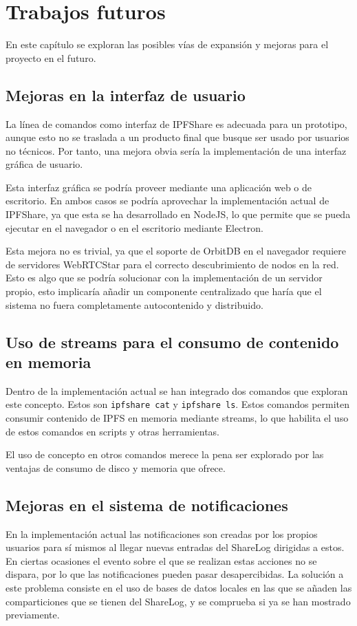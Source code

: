 \chapter{Trabajos futuros}\label{chap:7trabajosfuturos}

En este capítulo se exploran las posibles vías de expansión y mejoras para el proyecto en el futuro.

\section{Mejoras en la interfaz de usuario}
La línea de comandos como interfaz de IPFShare es adecuada para un prototipo, aunque esto no se traslada a un
producto final que busque ser usado por usuarios no técnicos. Por tanto, una mejora obvia sería la implementación de una interfaz gráfica de usuario.

Esta interfaz gráfica se podría proveer mediante una aplicación web o de escritorio. En ambos casos se podría aprovechar la implementación actual de IPFShare, ya que
esta se ha desarrollado en NodeJS, lo que permite que se pueda ejecutar en el navegador o en el escritorio mediante Electron\cite{BuildCrossplatformDesktop}.

Esta mejora no es trivial, ya que el soporte de OrbitDB en el navegador requiere de servidores WebRTCStar \cite{OrbitDBrtc2023} para el correcto descubrimiento de nodos en la red. Esto es algo que se podría solucionar con la implementación de un servidor propio, esto implicaría añadir un componente centralizado que
haría que el sistema no fuera completamente autocontenido y distribuido.

\section{Uso de streams para el consumo de contenido en memoria}
Dentro de la implementación actual se han integrado dos comandos que exploran este concepto. Estos son \texttt{ipfshare cat} y \texttt{ipfshare ls}.
Estos comandos permiten consumir contenido de IPFS en memoria mediante streams, lo que habilita el uso de estos comandos en scripts y otras herramientas.

El uso de concepto en otros comandos merece la pena ser explorado por las ventajas de consumo de disco y memoria que ofrece.

\section{Mejoras en el sistema de notificaciones}
En la implementación actual las notificaciones son creadas por los propios usuarios para sí mismos al llegar nuevas entradas
del ShareLog dirigidas a estos. En ciertas ocasiones el evento sobre el que se realizan estas acciones no se dispara, por lo que
las notificaciones pueden pasar desapercibidas. La solución a este problema consiste en el uso de bases de datos locales
en las que se añaden las comparticiones que se tienen del ShareLog, y se comprueba si ya se han mostrado previamente.


